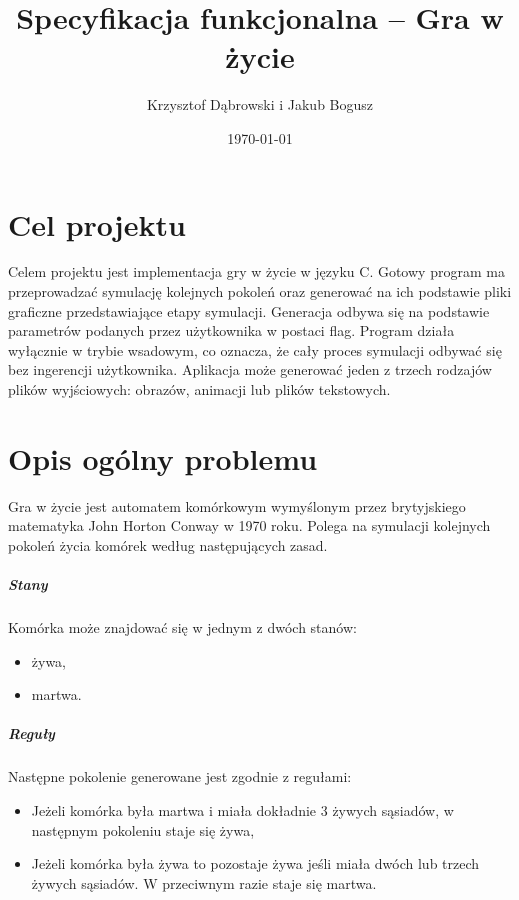 \documentclass{report}
\title{Specyfikacja funkcjonalna -- Gra w życie}
\author{Krzysztof Dąbrowski i Jakub Bogusz}
\date{\today}
\begin{document}
\maketitle{}

\tableofcontents{}

\chapter{Cel projektu}
Celem projektu jest implementacja gry w życie w języku C. Gotowy program ma przeprowadzać symulację kolejnych pokoleń oraz generować na ich podstawie pliki graficzne przedstawiające etapy symulacji. Generacja odbywa się na podstawie parametrów podanych przez użytkownika w postaci flag. Program działa wyłącznie w trybie wsadowym, co oznacza, że cały proces symulacji odbywać się bez ingerencji użytkownika. Aplikacja może generować jeden z trzech rodzajów plików wyjściowych: obrazów, animacji lub plików tekstowych.

\chapter{Opis ogólny problemu}
Gra w życie jest automatem komórkowym wymyślonym przez brytyjskiego matematyka John Horton Conway %
w 1970 roku. Polega na symulacji kolejnych pokoleń życia komórek według następujących zasad.


\paragraph{Stany}  Komórka może znajdować się w jednym z dwóch stanów:
\begin{itemize}
\item żywa,
\item martwa.
\end{itemize}

\paragraph{Reguły} Następne pokolenie generowane jest zgodnie z regułami:
\begin{itemize}
\item Jeżeli komórka była martwa i miała dokładnie 3 żywych sąsiadów, w następnym pokoleniu staje się żywa,
\item Jeżeli komórka była żywa to pozostaje żywa jeśli miała dwóch lub trzech żywych sąsiadów. W przeciwnym razie staje się martwa.
\end{itemize}
\end{document}
